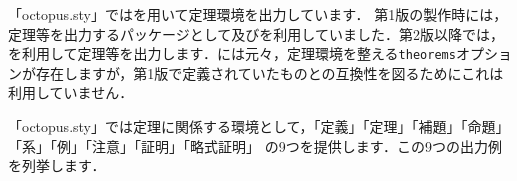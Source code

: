 \documentclass[uplatex]{jsreport}
\begin{document}
「octopus.sty」ではを用いて定理環境を出力しています．
第1版の製作時には，定理等を出力するパッケージとして及びを利用していました．第2版以降では，を利用して定理等を出力します．には元々，定理環境を整える\texttt{theorems}オプションが存在しますが，第1版で定義されていたものとの互換性を図るためにこれは利用していません．\par
「octopus.sty」では定理に関係する環境として，「定義」「定理」「補題」「命題」「系」「例」「注意」「証明」「略式証明」 の9つを提供します．この9つの出力例を列挙します．
\end{document}
